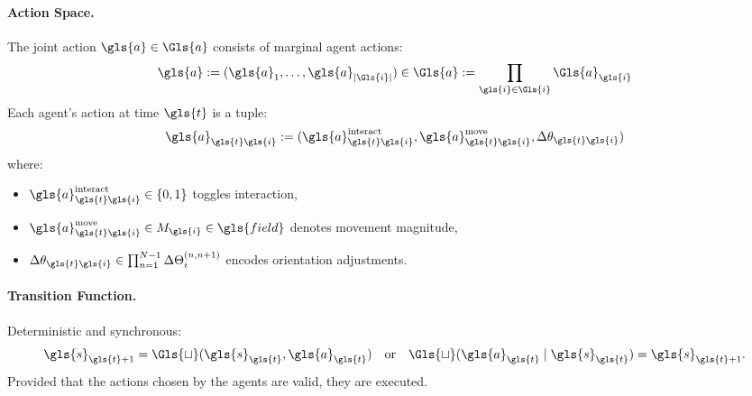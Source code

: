 \paragraph{Action Space.} 
The joint action \(\gls{a}\in\Gls{a}\) %
consists of marginal agent actions:
\[
    \gls{a} := (\gls{a}_1, \ldots, \gls{a}_{|\Gls{i}|})\in\Gls{a} 
    := \prod_{\gls{i}\in\Gls{i}} \Gls{a}_{\gls{i}}
\]
Each agent's action at time \(\gls{t}\) is a tuple:
\[
    \gls{a}_{\gls{t}\gls{i}} := (\gls{a}_{\gls{t}\gls{i}}^\text{interact}, 
        \gls{a}_{\gls{t}\gls{i}}^\text{move}, \Delta\theta_{\gls{t}\gls{i}})
\]
where:
\begin{itemize}
    \item \(\gls{a}_{\gls{t}\gls{i}}^\text{interact}\in\{0,1\}\) toggles interaction,
    \item \(\gls{a}_{\gls{t}\gls{i}}^\text{move} \in M_{\gls{i}}\in\gls{field}\) 
    denotes movement magnitude,
    \item \(\Delta\theta_{\gls{t}\gls{i}} \in \prod_{n=1}^{N-1} \Delta\Theta_i^{(n,n+1)}\) 
    encodes orientation adjustments.
\end{itemize}

\paragraph{Transition Function.} 
Deterministic and synchronous:
\[
    \gls{s}_{\gls{t}+1} = \mathcal{\Gls{t}}(\gls{s}_{\gls{t}}, \gls{a}_{\gls{t}}) 
    \quad \text{or} \quad 
    \mathcal{\Gls{t}}(\gls{a}_{\gls{t}} \mid \gls{s}_{\gls{t}}) = \gls{s}_{\gls{t}+1}.
\]
Provided that the actions chosen by the agents are valid, they are executed.

